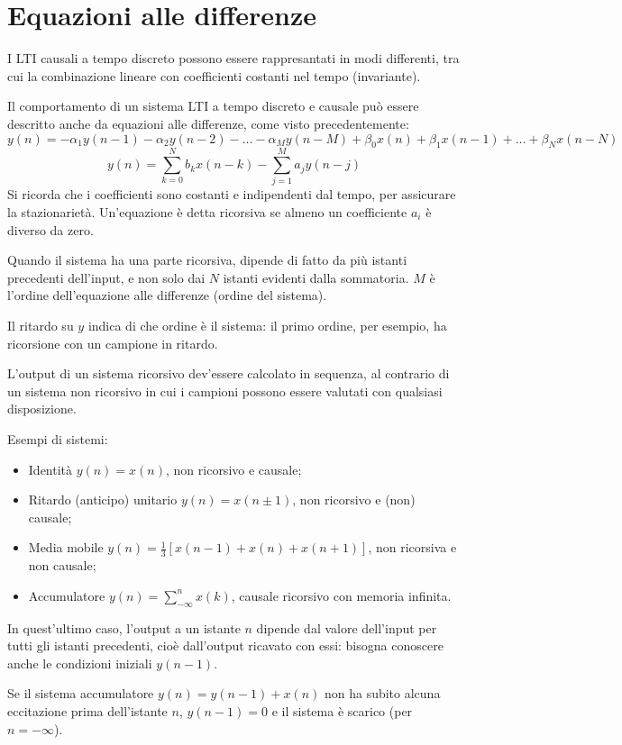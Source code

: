 \section{Equazioni alle differenze}
I LTI causali a tempo discreto possono essere rappresantati in modi differenti, tra cui la combinazione lineare con coefficienti costanti nel tempo (invariante). 

Il comportamento di un sistema LTI a tempo discreto e causale può essere descritto anche da equazioni alle differenze, come visto precedentemente:
$$y(n) = -\alpha_1y(n-1) - \alpha_2y(n - 2) - \dots - \alpha_My(n - M) + \beta_0x(n) + \beta_1x(n - 1) + \dots + \beta_Nx(n - N)$$
$$y(n) = \sum_{k=0}^{N} b_kx(n - k) - \sum_{j=1}^{M} a_jy(n - j)$$
Si ricorda che i coefficienti sono costanti e indipendenti dal tempo, per assicurare la stazionarietà. Un'equazione è detta ricorsiva se almeno un coefficiente $a_i$ è diverso da zero.

Quando il sistema ha una parte ricorsiva, dipende di fatto da più istanti precedenti dell'input, e non solo dai $N$ istanti evidenti dalla sommatoria. $M$ è l'ordine dell'equazione alle differenze (ordine del sistema).

Il ritardo su $y$ indica di che ordine è il sistema: il primo ordine, per esempio, ha ricorsione con un campione in ritardo. 

L'output di un sistema ricorsivo dev'essere calcolato in sequenza, al contrario di un sistema non ricorsivo in cui i campioni possono essere valutati con qualsiasi disposizione.

Esempi di sistemi:
\begin{itemize}
	\item Identità $y(n) = x(n)$, non ricorsivo e causale;
	\item Ritardo (anticipo) unitario $y(n) = x(n \pm 1)$, non ricorsivo e (non) causale;
	\item Media mobile $y(n) = \frac{1}{3} [x(n - 1) + x(n) + x(n + 1)]$, non ricorsiva e non causale;
	\item Accumulatore $y(n) = \sum_{-\infty}^{n} x(k)$, causale ricorsivo con memoria infinita.
\end{itemize}
In quest'ultimo caso, l'output a un istante $n$ dipende dal valore dell'input per tutti gli istanti precedenti, cioè dall'output ricavato con essi: bisogna conoscere anche le condizioni iniziali $y(n - 1)$.

Se il sistema accumulatore $y(n) = y(n - 1) + x(n)$ non ha subito alcuna eccitazione prima dell'istante $n$, $y(n - 1) = 0$ e il sistema è scarico (per $n = -\infty$).

